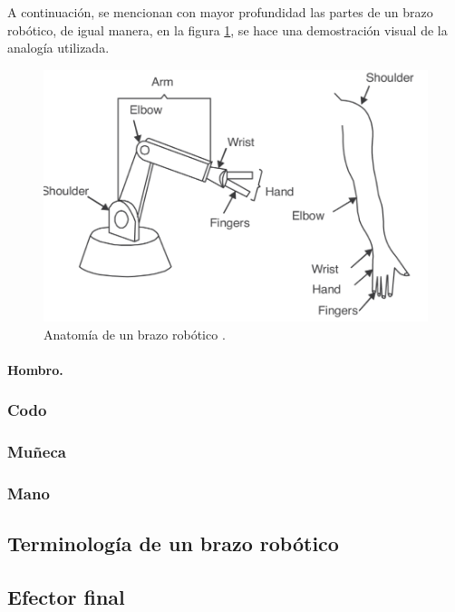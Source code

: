 A continuación, se mencionan con mayor profundidad las partes de un brazo robótico, de igual manera, en la figura \ref{fig:anatomiadeunbrazo}, se hace una demostración visual de la analogía utilizada.

\begin{figure}
    \centering
    \includegraphics[scale=0.8]{./img/chapter2/anatomiabrazo.png}
    \caption{Anatomía de un brazo robótico \cite{Gupta2016}.}
    \label{fig:anatomiadeunbrazo}
\end{figure}

\paragraph{Hombro.} 



\subsubsection{Codo}
\subsubsection{Muñeca}
\subsubsection{Mano}


\subsection{Terminología de un brazo robótico}




\subsection{Efector final}


